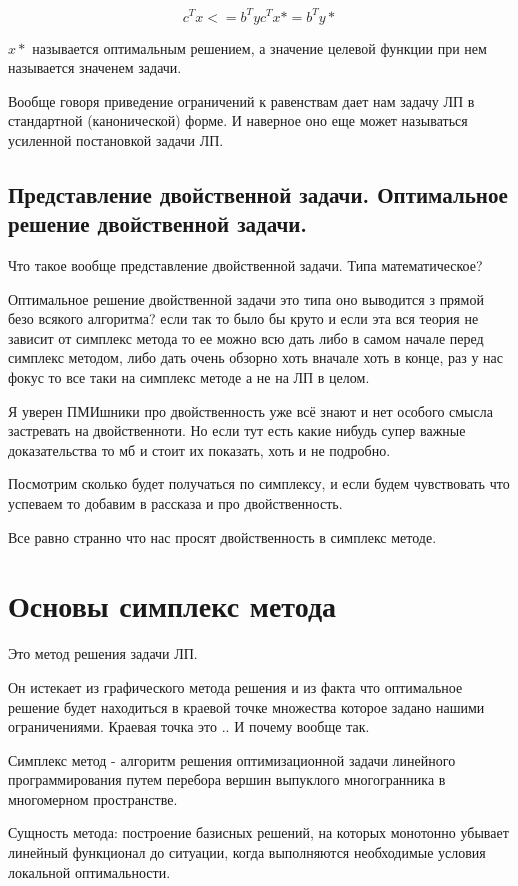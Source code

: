 \documentclass[a4paper,article,14pt]{extarticle}
\begin{document}
\[
c^T x <= b^T y

c^T x* = b^T y*
\]

\(x*\) называется оптимальным решением, а значение целевой функции при нем называется значенем задачи.

Вообще говоря приведение ограничений к равенствам дает нам задачу ЛП в стандартной (канонической) форме.
И наверное оно еще может называться усиленной постановкой задачи ЛП.
\subsection{Представление двойственной задачи. Оптимальное решение двойственной задачи.}

Что такое вообще представление двойственной задачи.
Типа математическое?

Оптимальное решение двойственной задачи это типа оно выводится з прямой безо всякого алгоритма?
если так то было бы круто и если эта вся теория не зависит от симплекс метода то ее можно всю дать либо в самом начале перед симплекс методом, либо дать очень обзорно хоть вначале хоть в конце, раз у нас фокус то все таки на симплекс методе а не на ЛП в целом.

Я уверен ПМИшники про двойственность уже всё знают и нет особого смысла застревать на двойственноти.
Но если тут есть какие нибудь супер важные доказательства то мб и стоит их показать, хоть и не подробно.

Посмотрим сколько будет получаться по симплексу, и если будем чувствовать что успеваем то добавим в рассказа и про двойственность.

Все равно странно что нас просят двойственность в симплекс методе.

\section{Основы симплекс метода}

Это метод решения задачи ЛП.

Он истекает из графического метода решения и из факта что оптимальное решение будет находиться в краевой точке множества которое задано нашими ограничениями.
Краевая точка это ..
И почему вообще так.

Симплекс метод - алгоритм решения оптимизационной задачи линейного программирования путем перебора вершин выпуклого многогранника в многомерном пространстве.

Сущность метода: построение базисных решений, на которых монотонно убывает линейный функционал до ситуации, когда выполняются необходимые условия локальной оптимальности.
\end{document}
